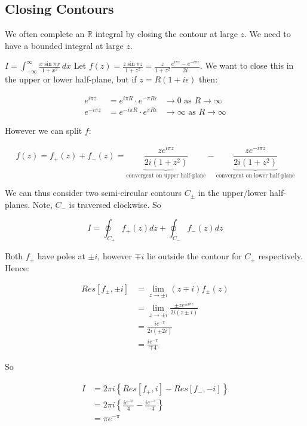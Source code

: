 \documentclass{../../physics_notes}
\begin{document}
\subsection{Closing Contours}

We often complete an $\mathbb{R}$ integral by closing the contour at large $z$. We need to have a bounded integral at large $z$.

\begin{example}{$I = \int_{-\infty}^{\infty} \frac{x\sin{\pi x}}{1 + x^2}\, dx $}
	Let $f(z) = \frac{z\sin{\pi z}}{1+z^2} = \frac{z}{1+z^2} \frac{e^{i\pi z} - e^{-i\pi z}}{2i}$. We want to close this in the upper or lower half-plane, but if $z = R(1 + i\epsilon)$ then:

	\begin{align*}
		e^{i\pi z} &= e^{i\pi R} \cdot e^{-\pi R \epsilon} &\to 0 \text{ as } R\to\infty \\
		e^{-i\pi z} &= e^{-i\pi R} \cdot e^{\pi R \epsilon} &\to \infty \text{ as } R\to\infty
	\end{align*}

	However we can split $f$:

	\[
		f(z) = f_+ (z) + f_- (z) = \underbrace{\frac{ze^{i\pi z}}{2i(1+z^2)}}_\text{convergent on upper half-plane} - \underbrace{\frac{ze^{-i\pi z}}{2i(1+z^2)}}_\text{convergent on lower half-plane}
	\]

	We can thus consider two semi-circular contours $C_\pm$ in the upper/lower half-planes. Note, $C_-$ is traversed clockwise. So

	\[ I = \oint_{C_+} f_+ (z) dz + \oint_{C_-} f_- (z) dz \]

	Both $f_\pm$ have poles at $\pm i$, however $\mp i$ lie outside the contour for $C_\pm$ respectively. Hence:

	\begin{align*}
		Res[f_\pm, \pm i] &= \lim_{z\to\pm i} (z\mp i) f_\pm (z) \\
		&= \lim_{z\to\pm i} \frac{\pm ze^{\pm i \pi z}}{2i(z\pm i)} \\
		&= \frac{ie^{-\pi}}{2i(\pm2i)} \\
		&= \frac{ie^{-\pi}}{\mp 4}
	\end{align*}

	So 

	\begin{align*}
		I &= 2\pi i \left\{ Res[f_+, i] - Res[f_-, -i] \right\} \\
		&= 2\pi i \left\{\frac{ie^{-\pi}}{4} - \frac{ie^{-\pi}}{-4}\right\} \\
		&= \pi e^{-\pi}
	\end{align*}
\end{example}
\end{document}
